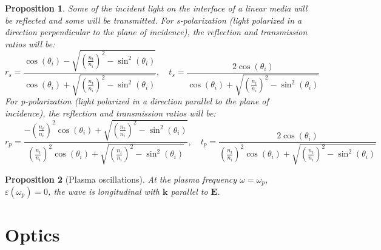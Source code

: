 \documentclass[a4paper]{article}
\newtheorem{prop}{Proposition}[section]
\theoremstyle{new}
\begin{document}
\begin{prop}
Some of the incident light on the interface of a linear media will be reflected and some will be transmitted. For s-polarization (light polarized in a direction perpendicular to the plane of incidence), the reflection and transmission ratios will be:
$$
r_s=\frac{\cos(\theta_i)-\sqrt{(\frac{n_t}{n_i})^2-\sin^2(\theta_i)}}{\cos(\theta_i)+\sqrt{(\frac{n_t}{n_i})^2-\sin^2(\theta_i)}},\quad t_s=\frac{2\cos(\theta_i)}{\cos(\theta_i)+\sqrt{(\frac{n_t}{n_i})^2-\sin^2(\theta_i)}}$$
For p-polarization (light polarized in a direction parallel to the plane of incidence), the reflection and transmission ratios will be:
$$
r_p=\frac{-(\frac{n_t}{n_i})^2\cos(\theta_i)+\sqrt{(\frac{n_t}{n_i})^2-\sin^2(\theta_i)}}{(\frac{n_t}{n_i})^2\cos(\theta_i)+\sqrt{(\frac{n_t}{n_i})^2-\sin^2(\theta_i)}},\quad t_p=\frac{2\cos(\theta_i)}{(\frac{n_t}{n_i})^2\cos(\theta_i)+\sqrt{(\frac{n_t}{n_i})^2-\sin^2(\theta_i)}}$$
\end{prop}
\begin{prop}[Plasma oscillations]
At the plasma frequency $\omega=\omega_p$, $\varepsilon(\omega_p)=0$, the wave is longitudinal with $\mathbf{k}$ parallel to $\mathbf{E}$.
\end{prop}
\newpage
\section{Optics}
\end{document}
